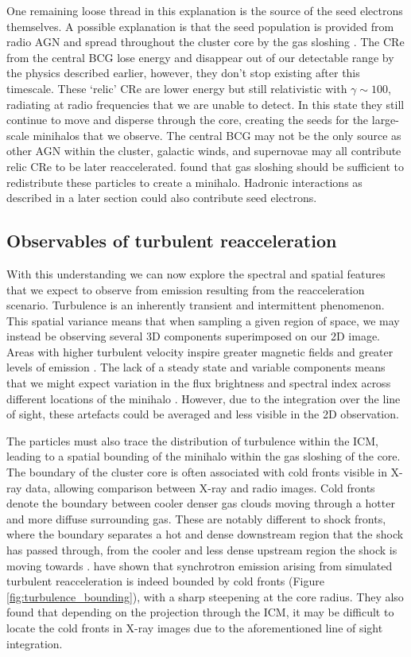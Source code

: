 One remaining loose thread in this explanation is the source of the seed electrons themselves. A possible explanation is that the seed population is provided from radio AGN and spread throughout the cluster core by the gas sloshing \citep{Brunetti2001}. The CRe from the central BCG lose energy and disappear out of our detectable range by the physics described earlier, however, they don't stop existing after this timescale. These `relic' CRe are lower energy but still relativistic with $\gamma\sim100$, radiating at radio frequencies that we are unable to detect. In this state they still continue to move and disperse through the core, creating the seeds for the large-scale minihalos that we observe. The central BCG may not be the only source as other AGN within the cluster, galactic winds, and supernovae may all contribute relic CRe to be later reaccelerated. \citet{ZuHone2013} found that gas sloshing should be sufficient to redistribute these particles to create a minihalo. Hadronic interactions as described in a later section could also contribute seed electrons.

\subsection{Observables of turbulent reacceleration}
With this understanding we can now explore the spectral and spatial features that we expect to observe from emission resulting from the reacceleration scenario. Turbulence is an inherently transient and intermittent phenomenon. This spatial variance means that when sampling a given region of space, we may instead be observing several 3D components superimposed on our 2D image. Areas with higher turbulent velocity inspire greater magnetic fields and greater levels of emission \citep{ZuHone2013}. The lack of a steady state and variable components means that we might expect variation in the flux brightness and spectral index across different locations of the minihalo \citep{Riseley2022}. However, due to the integration over the line of sight, these artefacts could be averaged and less visible in the 2D observation. 

The particles must also trace the distribution of turbulence within the ICM, leading to a spatial bounding of the minihalo within the gas sloshing of the core. The boundary of the cluster core is often associated with cold fronts visible in X-ray data, allowing comparison between X-ray and radio images. Cold fronts denote the boundary between cooler denser gas clouds moving through a hotter and more diffuse surrounding gas. These are notably different to shock fronts, where the boundary separates a hot and dense downstream region that the shock has passed through, from the cooler and less dense upstream region the shock is moving towards \citep{Markevitch2007}. \citet{ZuHone2013} have shown that synchrotron emission arising from simulated turbulent reacceleration is indeed bounded by cold fronts (Figure \ref{fig:turbulence_bounding}), with a sharp steepening at the core radius. They also found that depending on the projection through the ICM, it may be difficult to locate the cold fronts in X-ray images due to the aforementioned line of sight integration. 

